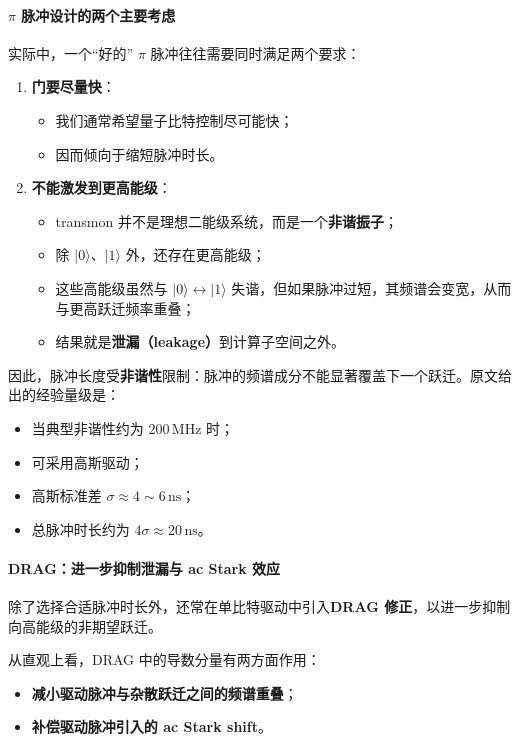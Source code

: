 \documentclass[12pt,a4paper,oneside]{ctexbook}
\begin{document}
\paragraph{\(\pi\) 脉冲设计的两个主要考虑}
实际中，一个“好的” \(\pi\) 脉冲往往需要同时满足两个要求：

\begin{enumerate}
    \item \textbf{门要尽量快}：
    \begin{itemize}
        \item 我们通常希望量子比特控制尽可能快；
        \item 因而倾向于缩短脉冲时长。
    \end{itemize}

    \item \textbf{不能激发到更高能级}：
    \begin{itemize}
        \item transmon 并不是理想二能级系统，而是一个\textbf{非谐振子}；
        \item 除 \(|0\rangle\)、\(|1\rangle\) 外，还存在更高能级；
        \item 这些高能级虽然与 \(|0\rangle \leftrightarrow |1\rangle\) 失谐，但如果脉冲过短，其频谱会变宽，从而与更高跃迁频率重叠；
        \item 结果就是\textbf{泄漏（leakage）}到计算子空间之外。
    \end{itemize}
\end{enumerate}

因此，脉冲长度受\textbf{非谐性}限制：脉冲的频谱成分不能显著覆盖下一个跃迁。原文给出的经验量级是：
\begin{itemize}
    \item 当典型非谐性约为 \(200\,\mathrm{MHz}\) 时；
    \item 可采用高斯驱动；
    \item 高斯标准差 \(\sigma \approx 4\sim 6\,\mathrm{ns}\)；
    \item 总脉冲时长约为 \(4\sigma \approx 20\,\mathrm{ns}\)。
\end{itemize}

\paragraph{DRAG：进一步抑制泄漏与 ac Stark 效应}
除了选择合适脉冲时长外，还常在单比特驱动中引入\textbf{DRAG 修正}，以进一步抑制向高能级的非期望跃迁。

从直观上看，DRAG 中的导数分量有两方面作用：
\begin{itemize}
    \item \textbf{减小驱动脉冲与杂散跃迁之间的频谱重叠}；
    \item \textbf{补偿驱动脉冲引入的 ac Stark shift}。
\end{itemize}
\end{document}
